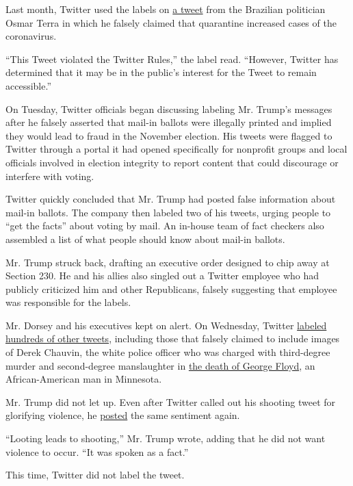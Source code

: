Last month, Twitter used the labels on
\href{https://twitter.com/OsmarTerra/status/1246474430676643842}{a
tweet} from the Brazilian politician Osmar Terra in which he falsely
claimed that quarantine increased cases of the coronavirus.

``This Tweet violated the Twitter Rules,'' the label read. ``However,
Twitter has determined that it may be in the public's interest for the
Tweet to remain accessible.''

On Tuesday, Twitter officials began discussing labeling Mr. Trump's
messages after he falsely asserted that mail-in ballots were illegally
printed and implied they would lead to fraud in the November election.
His tweets were flagged to Twitter through a portal it had opened
specifically for nonprofit groups and local officials involved in
election integrity to report content that could discourage or interfere
with voting.

Twitter quickly concluded that Mr. Trump had posted false information
about mail-in ballots. The company then labeled two of his tweets,
urging people to ``get the facts'' about voting by mail. An in-house
team of fact checkers also assembled a list of what people should know
about mail-in ballots.

Mr. Trump struck back, drafting an executive order designed to chip away
at Section 230. He and his allies also singled out a Twitter employee
who had publicly criticized him and other Republicans, falsely
suggesting that employee was responsible for the labels.

Mr. Dorsey and his executives kept on alert. On Wednesday, Twitter
\href{https://www.nytimes3xbfgragh.onion/2020/05/28/technology/trump-twitter-fact-check.html}{labeled
hundreds of other tweets}, including those that falsely claimed to
include images of Derek Chauvin, the white police officer who was
charged with third-degree murder and second-degree manslaughter in
\href{https://www.nytimes3xbfgragh.onion/2020/05/27/us/george-floyd-minneapolis-death.html}{the
death of George Floyd}, an African-American man in Minnesota.

Mr. Trump did not let up. Even after Twitter called out his shooting
tweet for glorifying violence, he
\href{https://twitter.com/realDonaldTrump/status/1266434153932894208}{posted}
the same sentiment again.

``Looting leads to shooting,'' Mr. Trump wrote, adding that he did not
want violence to occur. ``It was spoken as a fact.''

This time, Twitter did not label the tweet.


